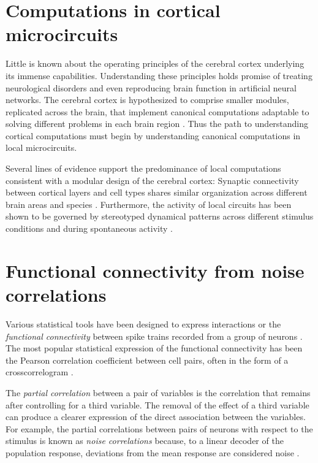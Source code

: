 \section{Computations in cortical microcircuits}
Little is known about the operating principles of the cerebral cortex underlying its immense capabilities. 
Understanding these principles holds promise of treating neurological disorders and even reproducing brain function in artificial neural networks.
The cerebral cortex is hypothesized to comprise smaller modules, replicated across the brain, that implement canonical computations adaptable to solving different problems in each brain region \citep{Mountcastle:1997, Douglas:2007}. 
Thus the path to understanding cortical computations must begin by understanding canonical computations in local microcircuits.

Several lines of evidence support the predominance of local computations consistent with a modular design of the cerebral cortex:
Synaptic connectivity between cortical layers and cell types shares similar organization across different brain areas and species \citep{Douglas:2004}. 
Furthermore, the activity of local circuits has been shown to be governed by stereotyped dynamical patterns across different stimulus conditions and during spontaneous activity \citep{MacLean:2005,Luczak:2009,Harris:2011,Hofer:2011,Miller:2014}. 

\section{Functional connectivity from noise correlations}
Various statistical tools have been designed to express interactions or the \emph{functional connectivity} between spike trains recorded from a group of neurons \citep{Brown:2004}. The most popular statistical expression of the functional connectivity has been the Pearson correlation coefficient between cell pairs, often in the form of a crosscorrelogram \citep{Gerstein:1969, Denman:2013, Sadovsky:2014}. 

The \emph{partial correlation} between a pair of variables is the correlation that remains after controlling for a third variable. The removal of the effect of a third variable can produce a clearer expression of the direct association between the variables.
For example, the partial correlations between pairs of neurons with respect to the stimulus is known as \emph{noise correlations} because, to a linear decoder of the population response, deviations from the mean response are considered noise \citep{Zohary:1994}. 

